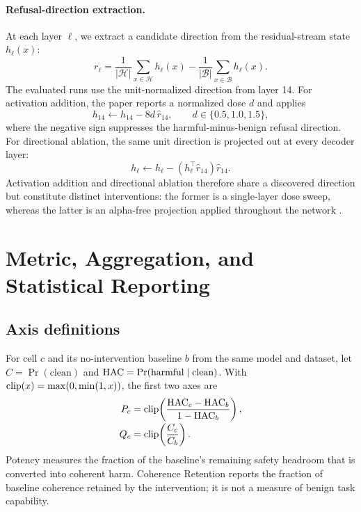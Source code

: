 \paragraph{Refusal-direction extraction.}
At each layer $\ell$, we extract a candidate direction from the residual-stream
state $h_\ell(x)$:
\begin{equation}
 r_\ell=
 \frac{1}{|\mathcal{H}|}\sum_{x\in\mathcal{H}}h_\ell(x)
 -\frac{1}{|\mathcal{B}|}\sum_{x\in\mathcal{B}}h_\ell(x).
 \label{eq:appendix-direction}
\end{equation}
The evaluated runs use the unit-normalized direction from layer 14. For
activation addition, the paper reports a normalized dose $d$ and applies
\begin{equation}
 h_{14}\leftarrow h_{14}-8d\,\widehat r_{14},
 \qquad d\in\{0.5,1.0,1.5\},
 \label{eq:appendix-steer}
\end{equation}
where the negative sign suppresses the harmful-minus-benign refusal direction.
For directional ablation, the same unit direction is projected out at every
decoder layer:
\begin{equation}
 h_\ell\leftarrow h_\ell-
 (h_\ell^{\top}\widehat r_{14})\widehat r_{14}.
 \label{eq:appendix-dirablate}
\end{equation}
Activation addition and directional ablation therefore share a discovered
direction but constitute distinct interventions: the former is a single-layer
dose sweep, whereas the latter is an alpha-free projection applied throughout
the network \citep{arditi2024refusal}.

\section{Metric, Aggregation, and Statistical Reporting}
\label{sec:appendix-metric}
\label{appendix-metric}

\subsection{Axis definitions}

For cell $c$ and its no-intervention baseline $b$ from the same model and
dataset, let $C=\Pr(\mathrm{clean})$ and
$\mathrm{HAC}=\Pr(\mathrm{harmful}\mid\mathrm{clean})$. With
$\operatorname{clip}(x)=\max(0,\min(1,x))$, the first two axes are
\begin{align}
 P_c
 &=\operatorname{clip}\!\left(\frac{\mathrm{HAC}_c-\mathrm{HAC}_b}{1-\mathrm{HAC}_b}\right),
 \nonumber\\[-2pt]
 Q_c
 &=\operatorname{clip}\!\left(\frac{C_c}{C_b}\right).
 \label{eq:appendix-pq}
\end{align}
Potency measures the fraction of the baseline's remaining safety headroom that
is converted into coherent harm. Coherence Retention reports the fraction of
baseline coherence retained by the intervention; it is not a measure of benign
task capability.

